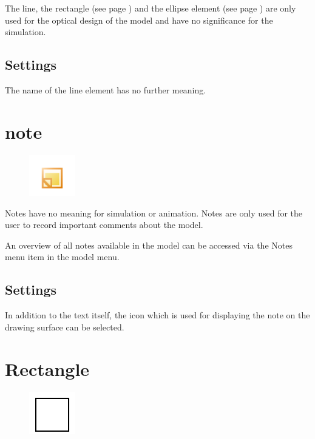 The line, the rectangle (see page \pageref{ref:ModelElementRectangle}) and the
ellipse element (see page \pageref{ref:ModelElementEllipse}) 
are only used for the optical design of the model and have no significance for the simulation.

\subsection*{Settings}

The name of the line element has no further meaning.


\section{note}
\label{ref:ModelElementNote}

\begin{figure}
\vspace{-22pt}
\includegraphics[width=2cm]{imageModelElementNote.png}
\vspace{-22pt}
\end{figure}

Notes have no meaning for simulation or animation.
Notes are only used for the user to record important comments about the model.

An overview of all notes available in the model can be accessed via
the Notes menu item in the model menu.

\subsection*{Settings}

In addition to the text itself, the icon which is used for displaying
the note on the drawing surface can be selected.


\section{Rectangle}
\label{ref:ModelElementRectangle}

\begin{figure}
\vspace{-22pt}
\includegraphics[width=2cm]{imageModelElementRectangle.png}
\vspace{-22pt}
\end{figure}

